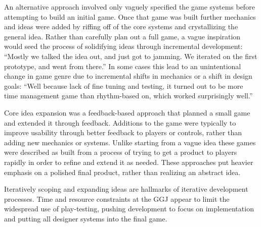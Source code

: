 \documentclass{sig-alternate}
\begin{document}
An alternative approach involved only vaguely specified the game systems before attempting to build an initial game. Once that game was built further mechanics and ideas were added by riffing off of the core systems and crystallizing the general idea.
Rather than carefully plan out a full game, a vague inspiration would seed the process of solidifying ideas through incremental development: ``Mostly we talked the idea out, and just got to jamming. We iterated on the first prototype, and went from there.''
In some cases this lead to an unintentional change in game genre due to incremental shifts in mechanics or a shift in design goals:
``Well because lack of fine tuning and testing, it turned out to be more time management game than rhythm-based on, which worked surprisingly well.''

Core idea expansion was a feedback-based approach that planned a small game and extended it through feedback. Additions to the game were typically to improve usability through better feedback to players or controls, rather than adding new mechanics or systems. Unlike starting from a vague idea these games were described as built from a process of trying to get a product to players rapidly in order to refine and extend it as needed. These approaches put heavier emphasis on a polished final product, rather than realizing an abstract idea.

Iteratively scoping and expanding ideas are hallmarks of iterative development processes. Time and resource constraints at the GGJ appear to limit the widespread use of play-testing, pushing development to focus on implementation and putting all designer systems into the final game. 


\end{document}
